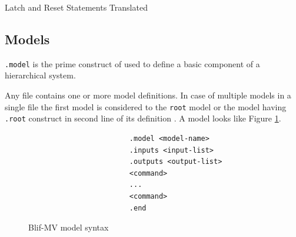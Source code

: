 \begin{table}

\hspace{3em}

\caption{Latch and Reset Statements Translated} \label{tab:lr}
\end{table}

\subsection{Models}
{\tt .model} is the prime construct of {\mv } used to define a
basic component of a hierarchical system.

Any {\mv } file contains one or more model definitions. In case of
multiple models in a single file the first model is considered to
the {\tt root} model or the model having {\tt .root} construct in
second line of its definition . A model looks like Figure
\ref{fig:model}.
\begin{figure}[h]
\begin{verbatim}
                        .model <model-name>
                        .inputs <input-list>
                        .outputs <output-list>
                        <command>
                        ...
                        <command>
                        .end
\end{verbatim}
\caption{{Blif-MV} model syntax} \label{fig:model}
\end{figure}

